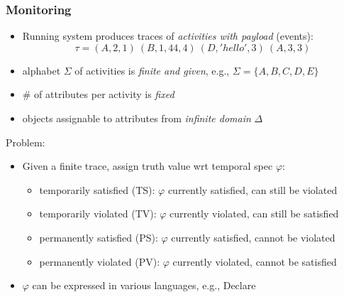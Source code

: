 \documentclass[xcolor=dvipsnames,aspectratio=169]{beamer}
\begin{document}
\begin{frame}
\frametitle{Monitoring}

\begin{itemize}
	\item Running system produces traces of \emph{activities with payload} (events): 
	$$\tau=(A,2,1)~(B,1,44,4)~(D,'hello',3)~(A,3,3)$$ 
	\item alphabet $\Sigma$ of activities is \emph{finite and given}, e.g., $\Sigma=\{A,B,C,D,E\}$
	\item \# of attributes per activity is \emph{fixed}
	\item objects assignable to attributes from \emph{infinite domain} $\Delta$
\end{itemize}

Problem:
\begin{itemize}
	\item Given a finite trace, assign truth value wrt temporal spec $\varphi$:
		\begin{itemize}
			\item temporarily satisfied (TS): $\varphi$ currently satisfied, can still be violated
			\item temporarily violated (TV): $\varphi$ currently violated, can still be satisfied
			\item permanently satisfied (PS): $\varphi$ currently satisfied, cannot be violated
			\item permanently violated (PV): $\varphi$ currently violated, cannot be satisfied
		\end{itemize}	
		

	\item $\varphi$ can be expressed in various languages, e.g., Declare
\end{itemize}

\end{frame}


\end{document}
